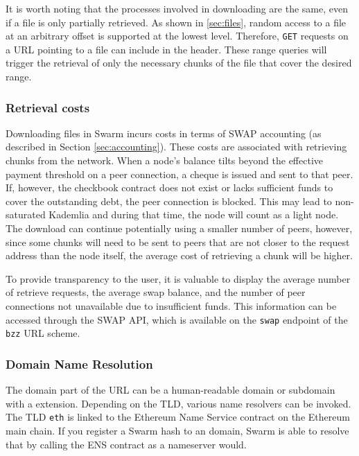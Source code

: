 It is worth noting that the processes involved in downloading are the same, even if a file is only partially retrieved. As shown in \ref{sec:files}, random access to a file at an arbitrary offset is supported at the lowest level. Therefore, \lstinline{GET} requests on a URL pointing to a file can include  in the header. These range queries will trigger the retrieval of only the necessary chunks of the file that cover the desired range.  

\subsubsection{Retrieval costs}

Downloading files in Swarm incurs costs in terms of SWAP accounting (as described in Section \ref{sec:accounting}). These costs are associated with retrieving chunks from the network. When a node's balance tilts beyond the effective payment threshold on a peer connection, a cheque is issued and sent to that peer. If, however, the checkbook contract does not exist or lacks sufficient funds to cover the outstanding debt, the peer connection is blocked. This may lead to non-saturated Kademlia and during that time, the node will count as a light node. The download can continue potentially using a smaller number of peers, however, since some chunks will need to be sent to peers that are not closer to the request address than the node itself, the average cost of retrieving a chunk will be higher. 

To provide transparency to the user, it is valuable to display the average number of retrieve requests, the average swap balance, and the number of peer connections not unavailable due to insufficient funds. This information can be accessed through the SWAP API, which is available on the \lstinline{swap} endpoint of the \lstinline{bzz} URL scheme.


\subsubsection{Domain Name Resolution}

The domain part of the URL can be a human-readable domain or subdomain with a  extension. Depending on the TLD, various name resolvers can be invoked. The TLD \lstinline{eth} is linked to the Ethereum Name Service contract on the Ethereum main chain. If you register a Swarm hash to an  domain, Swarm is able to resolve that by calling the ENS contract as a nameserver would. 

